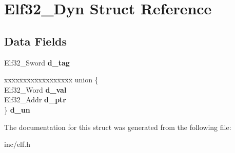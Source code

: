 \hypertarget{structElf32__Dyn}{}\section{Elf32\+\_\+\+Dyn Struct Reference}
\label{structElf32__Dyn}
\subsection*{Data Fields}
\begin{DoxyCompactItemize}
\item 
Elf32\+\_\+\+Sword {\bfseries d\+\_\+tag}\hypertarget{structElf32__Dyn_a0edbe45a1c49cbb352dc3e1937369180}{}\label{structElf32__Dyn_a0edbe45a1c49cbb352dc3e1937369180}

\item 
\begin{tabbing}
xx\=xx\=xx\=xx\=xx\=xx\=xx\=xx\=xx\=\kill
union \{\\
\>Elf32\_Word {\bfseries d\_val}\\
\>Elf32\_Addr {\bfseries d\_ptr}\\
\} {\bfseries d\_un}\hypertarget{structElf32__Dyn_ae099cc9b66d91c8d96a079c748491c99}{}\label{structElf32__Dyn_ae099cc9b66d91c8d96a079c748491c99}
\\

\end{tabbing}\end{DoxyCompactItemize}


The documentation for this struct was generated from the following file\+:\begin{DoxyCompactItemize}
\item 
inc/elf.\+h\end{DoxyCompactItemize}
